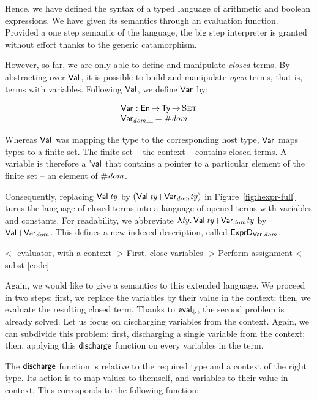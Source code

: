 Hence, we have defined the syntax of a typed language of arithmetic
and boolean expressions. We have given its semantics through an
evaluation function. Provided a one step semantic of the language, the
big step interpreter is granted without effort thanks to the generic
catamorphism.

However, so far, we are only able to define and manipulate
\emph{closed} terms. By abstracting over $\Val{\!}$, it is possible to
build and manipulate \emph{open} terms, that is, terms with
variables. Following $\Val{\!}$, we define $\Var{}{}$ by:

\[\stk{
\Var{}{} : \EnumU \To \Ty \To \Set \\
\Var{\V{dom}}{\_} = \EnumT{\V{dom}}
}\]

Whereas $\Val{\!}$ was mapping the type to the corresponding host type,
$\Var{}{}$ maps types to a finite set. The finite set -- the context
-- contains closed terms. A variable is therefore a $\Eval{\!}$ that
contains a pointer to a particular element of the finite set -- an
element of $\EnumT{\V{dom}}$. 

Consequently, replacing $\Val{\V{ty}}$ by
$(\SUM{\Val{\V{ty}}}{\Var{\V{dom}}{\V{ty}}})$ in
Figure~\ref{fig:hexpr-full} turns the language of closed terms into a
language of opened terms with variables and constants. For
readability, we abbreviate $\LAM{\V{ty}}
\SUM{\Val{\V{ty}}}{\Var{\V{dom}}{\V{ty}}}$ by
$\SUM{\Val{\!}}{\Var{\V{dom}}{}}$.  This defines a new indexed description,
called $\HExprVarD{\V{dom}}$.

\begin{wstructure}
        <- evaluator, with a context
            -> First, close variables
                -> Perform assignment
                <- subst [code]
\end{wstructure}

\newcommand{\discharge}{\F{discharge}}

Again, we would like to give a semantics to this extended language. We
proceed in two steps: first, we replace the variables by their value
in the context; then, we evaluate the resulting closed term. Thanks to
$\evalH$, the second problem is already solved. Let us focus on
discharging variables from the context. Again, we can subdivide this
problem: first, discharging a single variable from the context; then,
applying this $\discharge$ function on every variables in the term.

The $\discharge$ function is relative to the required type and a
context of the right type. Its action is to map values to themself,
and variables to their value in context. This corresponds to the
following function:

